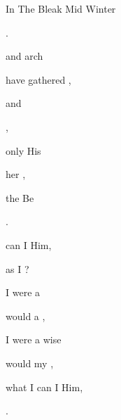 \begin{SBSong}{In The Bleak Mid Winter}
\begin{SBVerse}
     .
  \end{SBVerse}
  \CBPageBrk
  \begin{SBVerse}
     and arch 
    
     have gathered ,
    
     and  
    
      ,
    
     only His 
    
     her  , 
    
     the Be 
    
      .
  \end{SBVerse}
  \begin{SBVerse}
     can I  Him, 
    
     as I ?
    
     I were a 
    
     would  a ,
    
     I were a wise 
    
     would  my , 
    
     what I can I  Him, 
    
      .
 \end{SBVerse}
\end{SBSong}